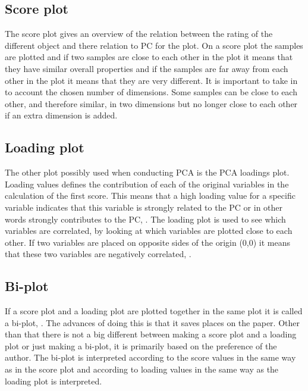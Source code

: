 \subsection*{Score plot}
The score plot gives an overview of the relation between the rating of the different object and there relation to PC for the plot. \blankline
%
%
On a score plot the samples are plotted and if two samples are close to each other in the plot it means that they have similar overall properties and if the samples are far away from each other in the plot it means that they are very different. It is important to take in to account the chosen number of dimensions. Some samples can be close to each other, and therefore similar, in two dimensions but no longer close to each other if an extra dimension is added. 
%
\subsection*{Loading plot}
The other plot possibly used when conducting PCA is the PCA loadings plot.
Loading values defines the contribution of each of the original variables in the calculation of the first score. This means that a high loading value for a specific variable indicates that this variable is strongly related to the PC or in other words strongly contributes to the PC, \parencite[p. 212]{Naes2010}. \blankline
%
The loading plot is used to see which variables are correlated, by looking at which variables are plotted close to each other. If two variables are placed on opposite sides of the origin (0,0) it means that these two variables are negatively correlated, \parencite[p. 216]{Naes2010}. 
%
\subsection*{Bi-plot}
If a score plot and a loading plot are plotted together in the same plot it is called a bi-plot, \parencite[p. 217]{Naes2010}. The advances of doing this is that it saves places on the paper. Other than that there is not a big different between making a score plot and a loading plot or just making a bi-plot, it is primarily based on the preference of the author. The bi-plot is interpreted according to the score values in the same way as in the score plot and according to loading values in the same way as the loading plot is interpreted. 
%
